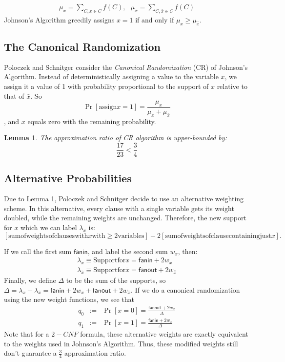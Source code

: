 \documentclass[11pt,letter]{article}
\newtheorem{lemma}{Lemma}
\begin{document}
\begin{align*}
\mu_x = \sum_{C,x\in C}f(C), \,\,\,\, \mu_{\bar{x}} =\sum_{C,\bar{x}\in C}f(C)
\end{align*}
Johnson's Algorithm greedily assigns $x=1$ if and only if $\mu_x \ge \mu_{\bar{x}}$.

\subsection{The Canonical Randomization}
Poloczek and Schnitger consider the \emph{Canonical Randomization} (CR) of Johnson's Algorithm. Instead of deterministically assigning a value to the variable $x$, we assign it a value of 1 with probability proportional to the support of $x$ relative to that of $\bar{x}$. So
\[\Pr[\mathrm{assign } x=1] = \frac{\mu_x}{\mu_x + \mu_{\bar{x}}}\], and $x$ equals zero with the remaining probability.

\begin{lemma}
\label{L:1}
The approximation ratio of CR algorithm is upper-bounded by:
$$\frac{17}{23} < \frac{3}{4}$$

\end{lemma}

\subsection{Alternative Probabilities}
Due to Lemma \ref{L:1}, Poloczek and Schnitger decide to use an alternative weighting scheme. In this alternative, every clause with a single variable gets its weight doubled, while the remaining weights are unchanged. Therefore, the new support for $x$ which we can label $\lambda_x$ is:
\[[\mathrm{sum of weights of clauses with }x\mathrm{ with }\ge 2\mathrm{ variables}] + 2[\mathrm{sum of weights of clause containing just }x].\]

If we call the first sum $\mathsf{fanin}$, and label the second sum $w_x$, then:
\begin{eqnarray*}
\lambda_x \equiv \mathrm{Support for } x = \mathsf{fanin} + 2w_x\\
\lambda_{\bar{x}} \equiv \mathrm{Support for } \bar{x} = \mathsf{fanout} + 2w_{\bar{x}}
\end{eqnarray*}
Finally, we define $\Delta$ to be the sum of the supports, so $\Delta = \lambda_{x} + \lambda_{\bar{x}} = \mathsf{fanin} + 2w_x + \mathsf{fanout} + 2w_{\bar{x}}$. If we do a canonical randomization  using the new weight functions, we see that
\begin{eqnarray*}
q_0 &:=& \Pr[x=0] = \frac{\mathsf{fanout} + 2w_{\bar{x}}}{\Delta}\\
q_1 &:=& \Pr[x=1] = \frac{\mathsf{fanin} + 2w_x}{\Delta}
\end{eqnarray*}
Note that for a $2-CNF$ formula, these alternative weights are exactly equivalent to the weights used in Johnson's Algorithm. Thus, these modified weights still don't guarantee a $\frac{3}{4}$ approximation ratio.
\end{document}
